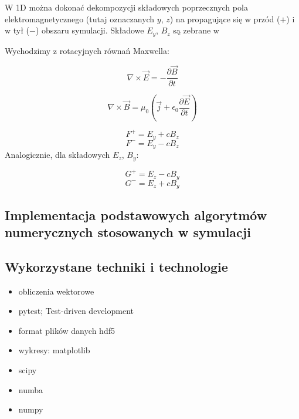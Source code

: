 W 1D można dokonać dekompozycji składowych poprzecznych pola elektromagnetycznego (tutaj oznaczanych $y$, $z$) na
propagujące się w przód ($+$) i w tył ($-$) obszaru symulacji. Składowe $E_y$, $B_z$ są zebrane w %

Wychodzimy z rotacyjnych równań Maxwella:

\begin{equation}
    \nabla \times \vec{E} = -\frac{\partial \vec{B}}{\partial t}
\end{equation}

\begin{equation}
    \nabla \times \vec{B} = \mu_0 (\vec{j} + \epsilon_0 \frac{\partial \vec{E}}{\partial t})
\end{equation}


\begin{equation}
    F^{+} = E_y + c B_z
\end{equation}
\begin{equation}
    F^{-} = E_y - c B_z
\end{equation}
Analogicznie, dla składowych $E_z$, $B_y$:

\begin{equation}
    G^{+} = E_z - c B_y
\end{equation}
\begin{equation}
    G^{-} = E_z + c B_y
\end{equation}

\subsection{Implementacja podstawowych algorytmów numerycznych stosowanych w symulacji}

\subsection{Wykorzystane techniki i technologie}
\begin{itemize}
    \item obliczenia wektorowe
    \item pytest; Test-driven development
    \item format plików danych hdf5
    \item wykresy: matplotlib
    \item scipy
    \item numba
    \item numpy
\end{itemize}

